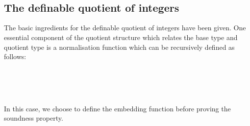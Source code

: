 \begin{code}
\\
\> \AgdaSymbol{:} \<%
\\
\> \AgdaSymbol{=} \<%
\\
\>[2]\<[3]%
\>[3]\AgdaSymbol{\{}  \<[19]%
\>[19]\AgdaSymbol{=} \<%
\\
\>[2]\<[3]%
\>[3]\AgdaSymbol{;}  \<[19]%
\>[19]\AgdaSymbol{=} \<%
\\
\>[2]\<[3]%
\>[3]\AgdaSymbol{;}  \AgdaSymbol{=} \<%
\\
\>[2]\<[3]%
\>[3]\AgdaSymbol{\}}\<%
\\
\end{code}

\subsection{The definable quotient of integers}

The basic ingredients for the definable quotient of integers have been
given. One essential component of the quotient structure which relates
the base type and quotient type is a normalisation
function which can be recursively defined as follows:
 
\begin{code}
\>\AgdaFunction{[\_]} \<[18]%
\>[18]\AgdaSymbol{:}   \<%
\\
\>\AgdaFunction{[}  \AgdaInductiveConstructor{,}  \AgdaFunction{]} \<[18]%
\>[18]\AgdaSymbol{=} \AgdaInductiveConstructor{+} \<%
\\
\>\AgdaFunction{[}  \AgdaInductiveConstructor{,}   \AgdaFunction{]} \<[18]%
\>[18]\AgdaSymbol{=}  \<%
\\
\>\AgdaFunction{[}   \AgdaInductiveConstructor{,}   \AgdaFunction{]} \AgdaSymbol{=} \AgdaFunction{[}  \AgdaInductiveConstructor{,}  \AgdaFunction{]}\<%
\end{code}

In this case, we choose to define the embedding function before
proving the soundness property.


